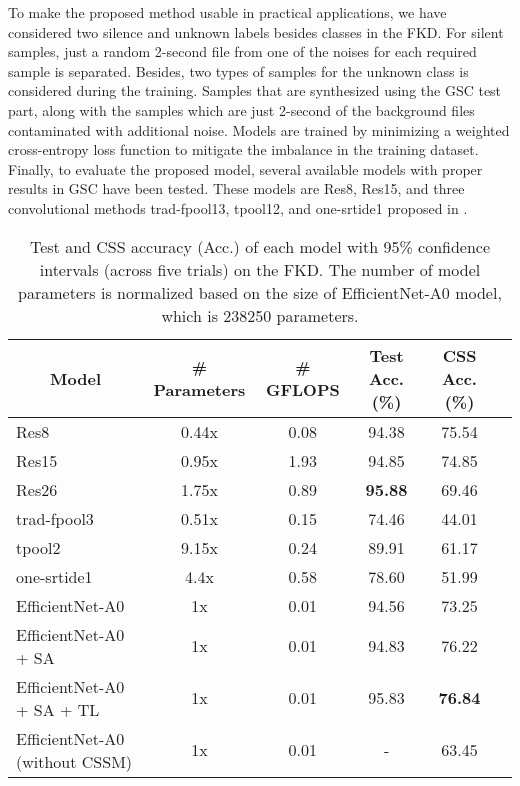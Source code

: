 \documentclass{article}
\begin{document}
To make the proposed method usable in practical applications, we have considered two silence and unknown labels besides classes in the FKD. For silent samples, just a random 2-second file from one of the noises for each required sample is separated. Besides, two types of samples for the unknown class is considered during the training. Samples that are synthesized using the GSC test part, along with the samples which are just 2-second of the background files contaminated with additional noise.  Models are trained by minimizing a weighted cross-entropy loss function to mitigate the imbalance in the training dataset. Finally, to evaluate the proposed model, several available models with proper results in GSC have been tested. These models are Res8, Res15, and three convolutional methods trad-fpool13, tpool12, and one-srtide1 proposed in \cite{cnnsmall}.

\begin{table*}[!]\centering
\caption{Test and CSS accuracy (Acc.) of each model with 95\% confidence intervals (across five trials) on the FKD. The number of model parameters is normalized based on the size of EfficientNet-A0 model, which is 238250 parameters.}
\label{tbl:result}
\begin{tabular}{lccccl}
\hline
\multicolumn{1}{c}{\textbf{Model}} & \textbf{\# Parameters} &\textbf{\# GFLOPS} & \textbf{Test Acc. (\%)} & \textbf{CSS Acc. (\%)} &  \\
\hline
Res8                               & 0.44x	&0.08                  & 94.38                 & 75.54                   &  \\
Res15                              & 0.95x 	&1.93                 & 94.85              & 74.85                   &  \\
Res26                              & 1.75x 	&0.89                 & \textbf{95.88}           & 69.46                  &  \\
trad-fpool3                        & 0.51x 	&0.15                & 74.46                    & 44.01                   &  \\
tpool2                             & 9.15x	&0.24                  & 89.91                    & 61.17                   &  \\
one-srtide1                        & 4.4x	&0.58                  & 78.60                    & 51.99                   &  \\
EfficientNet-A0                    & 1x	&0.01                     & 94.56                    & 73.25                   &  \\
EfficientNet-A0 + SA               & 1x	&0.01                     & 94.83                    & 76.22                   &  \\
EfficientNet-A0 + SA + TL          & 1x	&0.01                     & 95.83                    & \textbf{76.84}         &\\
EfficientNet-A0  (without CSSM)                 & 1x	&0.01                     & -                    & 63.45                   &  \\
\hline
\end{tabular}
\end{table*}
\end{document}
